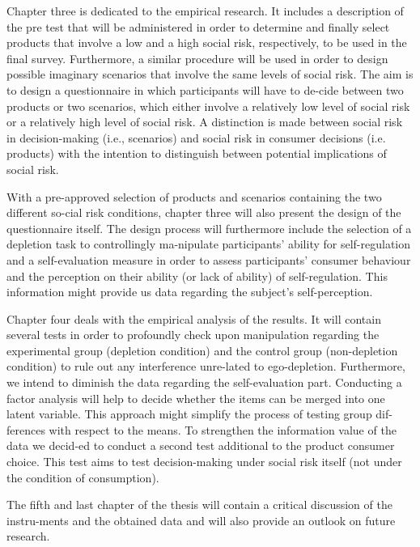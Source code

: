 Chapter three is dedicated to the empirical research. It includes a description of the pre test that will be administered in order to determine and finally select products that involve a low and a high social risk, respectively, to be used in the final survey. Furthermore, a similar procedure will be used in order to design possible imaginary scenarios that involve the same levels of social risk. The aim is to design a questionnaire in which participants will have to de-cide between two products or two scenarios, which either involve a relatively low level of social risk or a relatively high level of social risk. A distinction is made between social risk in decision-making \parencite{danziger2011extraneous} (i.e., scenarios) and social risk in consumer decisions (i.e. products) with the intention to distinguish between potential implications of social risk.\par
With a pre-approved selection of products and scenarios containing the two different so-cial risk conditions, chapter three will also present the design of the questionnaire itself. The design process will furthermore include the selection of a depletion task to controllingly ma-nipulate participants’ ability for self-regulation and a self-evaluation measure in order to assess participants’ consumer behaviour and the perception on their ability (or lack of ability) of self-regulation. This information might provide us data regarding the subject’s self-perception.\par
Chapter four deals with the empirical analysis of the results. It will contain several tests in order to profoundly check upon manipulation regarding the experimental group (depletion condition) and the control group (non-depletion condition) to rule out any interference unre-lated to ego-depletion. Furthermore, we intend to diminish the data regarding the self-evaluation part. Conducting a factor analysis will help to decide whether the items can be merged into one latent variable. This approach might simplify the process of testing group dif-ferences with respect to the means. To strengthen the information value of the data we decid-ed to conduct a second test additional to the product consumer choice. This test aims to test decision-making under social risk itself  (not under the condition of consumption).\par
The fifth and last chapter of the thesis will contain a critical discussion of the instru-ments and the obtained data and will also provide an outlook on future research.\par